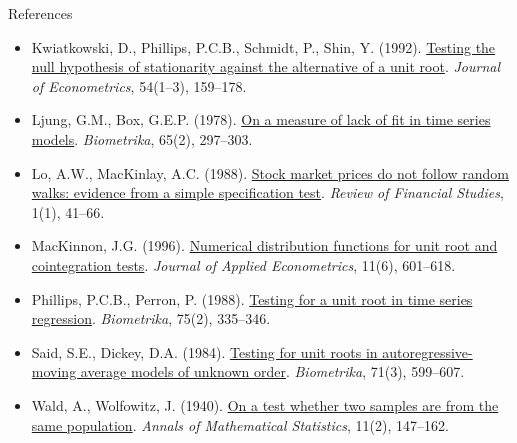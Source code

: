 \begin{frame}{References}
\begin{itemize}
    \item Kwiatkowski, D., Phillips, P.C.B., Schmidt, P., Shin, Y. (1992). \href{https://doi.org/10.1016/0304-4076(92)90104-Y}{Testing the null hypothesis of stationarity against the alternative of a unit root}. \textit{Journal of Econometrics}, 54(1--3), 159--178.
    \item Ljung, G.M., Box, G.E.P. (1978). \href{https://doi.org/10.1093/biomet/65.2.297}{On a measure of lack of fit in time series models}. \textit{Biometrika}, 65(2), 297--303.
    \item Lo, A.W., MacKinlay, A.C. (1988). \href{https://doi.org/10.1093/rfs/1.1.41}{Stock market prices do not follow random walks: evidence from a simple specification test}. \textit{Review of Financial Studies}, 1(1), 41--66.
    \item MacKinnon, J.G. (1996). \href{https://doi.org/10.1002/(SICI)1099-1255(199611)11:6<601::AID-JAE417>3.0.CO;2-T}{Numerical distribution functions for unit root and cointegration tests}. \textit{Journal of Applied Econometrics}, 11(6), 601--618.
    \item Phillips, P.C.B., Perron, P. (1988). \href{https://doi.org/10.1093/biomet/75.2.335}{Testing for a unit root in time series regression}. \textit{Biometrika}, 75(2), 335--346.
    \item Said, S.E., Dickey, D.A. (1984). \href{https://doi.org/10.1093/biomet/71.3.599}{Testing for unit roots in autoregressive-moving average models of unknown order}. \textit{Biometrika}, 71(3), 599--607.
    \item Wald, A., Wolfowitz, J. (1940). \href{https://doi.org/10.1214/aoms/1177731909}{On a test whether two samples are from the same population}. \textit{Annals of Mathematical Statistics}, 11(2), 147--162.
\end{itemize}
\end{frame}


